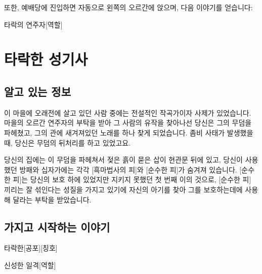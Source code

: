 \documentclass{report}
\begin{document}
			또한, 예배당에 진입하면 자동으로 왼쪽의 오르간에 앉으며, 다음 이야기를 얻습니다:
			\begin{spoiler}{타락의 연주자}{[역할]}
				
				
			\end{spoiler}
	
	
	
	
	
	\pagebreak
	\section{타락한 성기사}
		\subsection*{알고 있는 정보}
			이 마을에 오래전에 살고 있던 사람 중에는 전설적인 작곡가이자 사제가 있었습니다. 마을의 오르간 연주자의 부탁을 받아 그 사람의 유작을 찾아나선 당신은 그의 무덤을 파헤쳤고, 그의 관에 새겨져있던 노래를 하나 찾게 되었습니다. 좀비 사태가 발생했을 때, 당신은 무덤의 뒤처리를 하고 있었고요.
			
			당신의 집에는 이 무덤을 파헤쳐서 젖은 흙이 묻은 삽이 현관문 뒤에 있고, 당신이 사용했던 방패와 십자가에는 각각 [흑마법사의 피]와 [순수한 피]가 숨겨져 있습니다. [순수한 피]는 당신의 보호 하에 있었지만 지키지 못했던 첫 번째 이의 것으로, [순수한 피] 끼리는 잘 섞인다는 성질을 가지고 있기에 자신의 아기를 찾아 그를 보호하는데에 사용해 달라는 부탁을 받았습니다.
			
		\subsection*{가지고 시작하는 이야기}
			\begin{spoiler}{타락한}{[공포][칭호]}
				
			\end{spoiler}
			
			\begin{spoiler}{신성한 일격}{[역할]}
			\end{spoiler}
		
\end{document}
